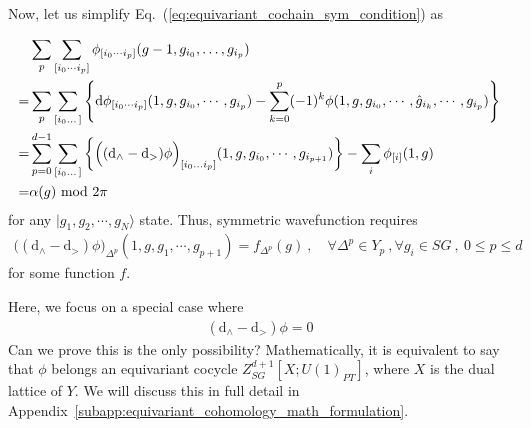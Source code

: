 \documentclass[reprint,amsmath,amssymb,aps,pra,]{revtex4-1}
\newcommand{\dd}{\mathrm{d}} %
\begin{document}
Now, let us simplify Eq.~(\ref{eq:equivariant_cochain_sym_condition}) as
\begin{widetext}
  \begin{align}
    &\sum_{p}\sum_{[i_0\cdots i_{p}]}\phi_{[i_0\cdots i_{p}]}(g-1,g_{i_0},\dots,g_{i_{p}})\notag\\
    =&\sum_p\sum_{[i_0\dots]}\left\{ \dd \phi_{[i_0\cdots i_{p}]}(1,g,g_{i_0},\cdots,g_{i_{p}})-\sum_{k=0}^{p}(-1)^k\phi(1,g,g_{i_0},\cdots,\hat{g}_{i_k},\cdots,g_{i_{p}}) \right\}\notag\\
    =&\sum_{p=0}^{d-1}\sum_{[i_0\dots]}\left\{ \Big((\dd_\wedge-\dd_>)\phi\Big)_{[i_0\ldots i_{p}]}(1,g,g_{i_0},\cdots,g_{i_{p+1}})\right\}-\sum_{i}\phi_{[i]}(1,g)\notag\\
    =&\alpha(g)\!\!\mod 2\pi
  \end{align}
  for any $|g_1,g_2,\cdots,g_N\rangle$ state.
  Thus, symmetric wavefunction requires 
  \begin{align}
    \Big( (\dd_\wedge-\dd_>)\phi\Big)_{\Delta^p}(1,g,g_1,\cdots,g_{p+1})=f_{\Delta^p}(g)~,\quad \forall \Delta^p\in Y_p~,\forall g_i\in SG~,~0\le p\le d
  \end{align}
  for some function $f$.
\end{widetext}
  Here, we focus on a special case where
  \begin{align}
    (\dd_\wedge-\dd_>)\phi=0
    \label{eq:equivariant_cocycle_condition}
  \end{align}
  {\color{red} Can we prove this is the only possibility?}
  Mathematically, it is equivalent to say that $\phi$ belongs an equivariant cocycle $Z^{d+1}_{SG}[X;U(1)_{PT}]$, where $X$ is the dual lattice of $Y$.
  We will discuss this in full detail in Appendix~\ref{subapp:equivariant_cohomology_math_formulation}.
\end{document}
